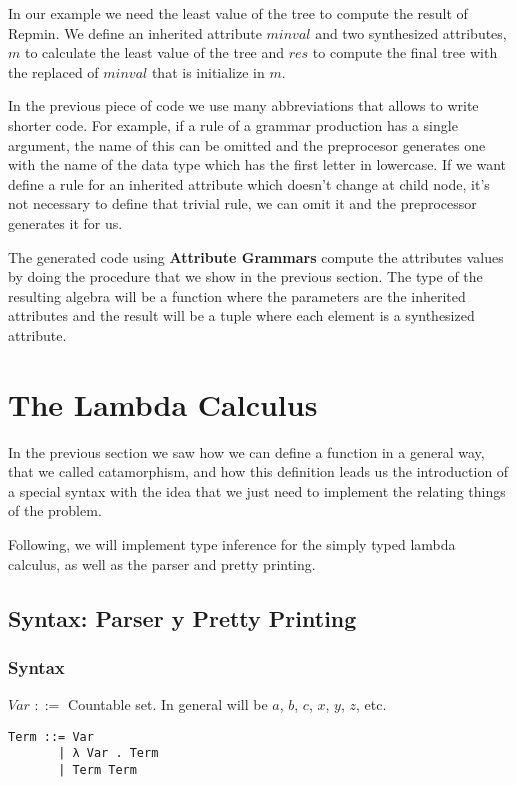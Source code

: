 \documentclass[a4paper,10pt]{article}
\begin{document}
In our example we need the least value of the tree to compute the result of Repmin. We define
an inherited attribute $minval$ and two synthesized attributes, $m$ to calculate the least value
of the tree and $res$ to compute the final tree with the replaced of $minval$ that is initialize
in $m$.
  
In the previous piece of code we use many abbreviations that allows to write shorter code. For example,
if a rule of a grammar production has a single argument, the name of this can be omitted and the preprocesor generates 
one with the name of the data type which has the first letter in lowercase. 
If we want define a rule for an inherited attribute which doesn't change at child node, 
it's not necessary to define that trivial rule, we can omit it and the preprocessor generates it for us.

The generated code using \textbf{Attribute Grammars} compute the attributes values by doing the
procedure that we show in the previous section. The type of the resulting algebra will be a function
where the parameters are the inherited attributes and the result will be a tuple where each element
is a synthesized attribute.
  

\section{The Lambda Calculus}

In the previous section we saw how we can define a function in a general way, that we called
catamorphism, and how this definition leads us the introduction of a special syntax
with the idea that we just need to implement the relating things of the problem.

Following, we will implement type inference for the simply typed lambda calculus, as
well as the parser and pretty printing.

\subsection{Syntax: Parser y Pretty Printing}

\subsubsection{Syntax}

$Var$ $::=$ Countable set. In general will be $a$, $b$, $c$, $x$, $y$, $z$, etc.

\begin{lstlisting}
Term ::= Var
       | λ Var . Term
       | Term Term
\end{lstlisting}
\end{document}
